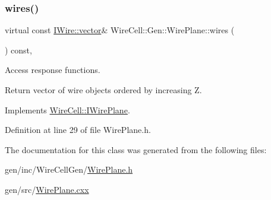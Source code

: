 \subsubsection{\texorpdfstring{wires()}{wires()}}
{\footnotesize\ttfamily virtual const \hyperlink{class_wire_cell_1_1_i_data_ae1a9f863380499bb43f39fabb6276660}{I\+Wire\+::vector}\& Wire\+Cell\+::\+Gen\+::\+Wire\+Plane\+::wires (\begin{DoxyParamCaption}{ }\end{DoxyParamCaption}) const\hspace{0.3cm}{\ttfamily [inline]}, {\ttfamily [virtual]}}



Access response functions. 

Return vector of wire objects ordered by increasing Z. 

Implements \hyperlink{class_wire_cell_1_1_i_wire_plane_ad5f6668d7faefcd895daf602dc60be1a}{Wire\+Cell\+::\+I\+Wire\+Plane}.



Definition at line 29 of file Wire\+Plane.\+h.



The documentation for this class was generated from the following files\+:\begin{DoxyCompactItemize}
\item 
gen/inc/\+Wire\+Cell\+Gen/\hyperlink{_wire_plane_8h}{Wire\+Plane.\+h}\item 
gen/src/\hyperlink{_wire_plane_8cxx}{Wire\+Plane.\+cxx}\end{DoxyCompactItemize}
